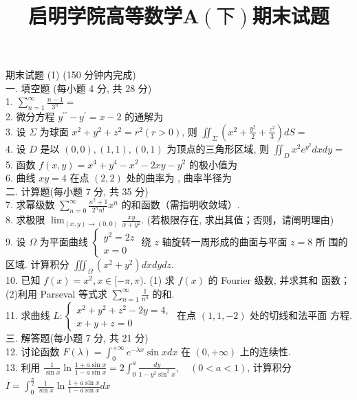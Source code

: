 \documentclass[a4paper,11pt,UTF8]{article}
\title{启明学院高等数学A$\left(\text{下}\right)$期末试题}
\author{}
\date{}
\begin{document}
\maketitle
期末试题 (1) (150 分钟内完成)\\
一. 填空题 (每小题 4 分, 共 28 分)\\
1. $\displaystyle \sum_{n=1}^{\infty} \frac{n-1}{3^n}=$\\
2. 微分方程 $y^{\prime \prime}-y^{\prime}=x-2$ 的通解为\\
3. 设 $\Sigma$ 为球面 $x^2+y^2+z^2=r^2(r>0)$, 则 $\displaystyle\iint_{\Sigma}\left(x^2+\frac{y^2}{2}+\frac{z^2}{3}\right) d S=$\\
4. 设 $D$ 是以 $(0,0),(1,1),(0,1)$ 为顶点的三角形区域, 则 $\displaystyle \iint_D x^2 e^{y^2} d x d y=$\\
5. 函数 $f(x, y)=x^4+y^4-x^2-2 x y-y^2$ 的极小值为\\
6. 曲线 $x y=4$ 在点 $(2,2)$ 处的曲率为 , 曲率半径为\\
二. 计算题(每小题 7 分, 共 35 分)\\
7. 求幂级数 $\displaystyle \sum_{n=0}^{\infty} \frac{n^2+1}{2^n n !} x^n$ 的和函数（需指明收敛域）.\\
8. 求极限 $\displaystyle \lim _{(x, y) \rightarrow(0,0)} \frac{x y}{x+y^2}$. (若极限存在, 求出其值；否则，请阐明理由)\\
9. 设 $\Omega$ 为平面曲线 $\left\{\begin{array}{l}y^2=2 z \\ x=0\end{array}\right.$ 绕 $z$ 轴旋转一周形成的曲面与平面 $z=8$ 所 围的区域. 计算积分 $\displaystyle \iiint_{\Omega}\left(x^2+y^2\right) d x d y d z$.\\
10. 已知 $f(x)=x^2, x \in[-\pi, \pi)$. (1) 求 $f(x)$ 的 Fourier 级数, 并求其和 函数；(2)利用 Parseval 等式求 $\displaystyle \sum_{n=1}^{\infty} \frac{1}{n^4}$ 的和.\\
11. 求曲线 $L:\left\{\begin{array}{l}x^2+y^2+z^2-2 y=4, \\ x+y+z=0\end{array}\right.$ 在点 $(1,1,-2)$ 处的切线和法平面
方程.\\
三. 解答题(每小题 7 分, 共 21 分)\\
12. 讨论函数 $\displaystyle F(\lambda)=\int_0^{+\infty} e^{-\lambda x} \sin x d x$ 在 $(0,+\infty)$ 上的连续性.\\
13. 利用 $\displaystyle \frac{1}{\sin x} \ln \frac{1+a \sin x}{1-a \sin x}=2 \int_0^a \frac{d y}{1-y^2 \sin ^2 x}, \quad(0<a<1)$, 计算积分 $\displaystyle I=\int_0^{\frac{\pi}{2}} \frac{1}{\sin x} \ln \frac{1+a \sin x}{1-a \sin x} d x$\\
\end{document}

